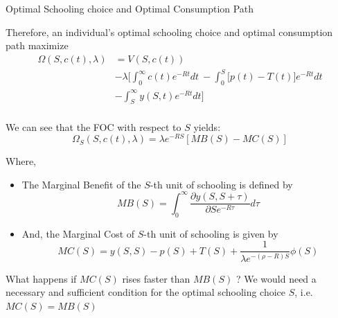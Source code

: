 \documentclass{beamer}
\begin{document}
\begin{frame}{Optimal Schooling choice and Optimal Consumption Path}

Therefore, an individual’s optimal schooling choice and optimal consumption path maximize
\begin{align*}
    \Omega(S,c(t),\lambda) &  =  V(S,c(t)) \\
                           &  - \lambda \Bigg[ \int_{0}^{\infty}c(t)e^{-Rt}dt~- \int_{0}^{S}\Big[ p(t)- T(t)\Big]e^{-R t} dt \\
                           &  - \int_{S}^{\infty}y(S,t)e^{-R t} dt \Bigg]\\
\end{align*}

We can see that the FOC with respect to $S$ yields:
\begin{equation*}
    \Omega_{S}(S,c(t),\lambda)=\lambda e^{-RS}[MB(S)-MC(S)]
\end{equation*}
\end{frame}

\begin{frame}{}
    Where, 
    \begin{itemize}
        \item The Marginal Benefit of the $S$-th unit of schooling is defined by
        \begin{equation*}
            MB(S) = \int_{0}^{\infty} \frac{\partial y(S,S+\tau)}{\partial Se^{-R \tau}} d \tau
        \end{equation*}
        \item And, the Marginal Cost of $S$-th unit of schooling is given by
        \begin{equation*}
            MC(S) = y(S,S) - p(S) + T(S) +\frac{1}{\lambda e^{-(\rho - R)S}}\phi(S)
        \end{equation*}
    \end{itemize}
\begin{block}{What happens if $MC(S)$ rises faster than $MB(S)$ ?} 
We would need a necessary and sufficient condition for the optimal schooling choice $S$, i.e. $MC(S)=MB(S)$
\end{block}
\end{frame}
\end{document}
